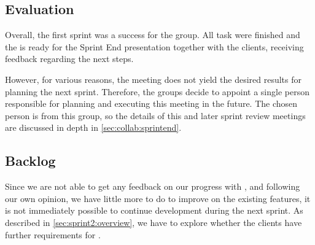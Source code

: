 
\subsection{Evaluation}
Overall, the first sprint was a success for the group.
All task were finished and the \launcher is ready for the Sprint End presentation together with the clients, receiving feedback regarding the next steps.

However, for various reasons, the meeting does not yield the desired results for planning the next sprint.
Therefore, the groups decide to appoint a single person responsible for planning and executing this meeting in the future.
The chosen person is from this group, so the details of this and later sprint review meetings are discussed in depth in \cref{sec:collab:sprintend}.

\subsection{Backlog}
Since we are not able to get any feedback on our progress with \launcher, and following our own opinion, we have little more to do to improve on the existing features, it is not immediately possible to continue development during the next sprint. 
As described in \cref{sec:sprint2:overview}, we have to explore whether the clients have further requirements for \launcher. 